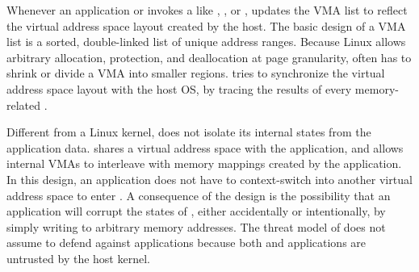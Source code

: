 Whenever an application or \glibc{} invokes a \linuxapi{} like , , or , \thelibos{} updates the VMA list
to reflect the virtual address space layout created by the host.
The basic design of a VMA list is a sorted, double-linked list of unique address ranges.
Because Linux allows arbitrary allocation, protection, and deallocation at page granularity, \thelibos{} often has to shrink or divide a VMA
into smaller regions.
\thelibos{} tries to synchronize
the virtual address space layout with the host OS, by tracing the results of every memory-related \hostapis{}.







Different from a Linux kernel, \thelibos{} does not isolate its internal states from the application data.
\thelibos{} shares a virtual address space with the application,
and allows internal VMAs to interleave with memory mappings created by the application.
In this design, an application does not have to context-switch into another virtual address space to enter \thelibos{}.
A consequence of the design is the possibility that an application will corrupt the states of \thelibos{}, either accidentally or intentionally, by simply writing to arbitrary memory addresses.
The threat model of \graphene{} does not assume
\thelibos{} to defend against applications because both \thelibos{} and applications are untrusted by the host kernel. 




